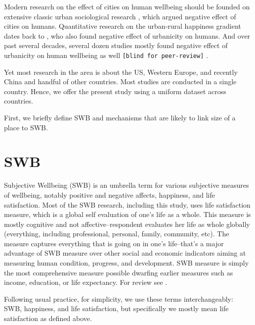 \documentclass[10pt, letterpaper]{article}
\begin{document}

Modern research on the effect of cities on human wellbeing should be founded on
extensive classic urban sociological research \citep{tonnies57,wirth38,simmel03,park15,park84}, 
which argued negative effect of cities on humans.
%
Quantitative research on the urban-rural happiness gradient dates back to
\citep{gurin60,campbell76etal}, who also found negative effect of
urbanicity on humans. And over past several decades, several dozen studies
mostly found negative effect of urbanicity on human wellbeing as well
\texttt{[blind for peer-review]}%
. 

Yet most research in the area is about the US, Western Europe, and recently China and handful of
other countries. Most studies are conducted in a single country. Hence, we offer
the present study using a uniform dataset across countries.

First, we briefly define SWB and mechanisms that are likely to link size of a
place to SWB. 
  
   
\section{SWB}

Subjective Wellbeing (SWB) is an umbrella term for various subjective measures
of wellbeing, notably positive and negative affects, happiness, and life
satisfaction. Most of the SWB research, including this study, uses life satisfaction measure, which is
a global self evaluation of one's life as a whole. This measure is mostly
cognitive and not affective--respondent evaluates her life as whole globally (everything,
including professional, personal, family, community, etc). The measure captures
everything that is going on in one's life--that's a major advantage of SWB
measure over other social and economic indicators aiming at measuring human
condition, progress, and development. SWB measure is simply the most
comprehensive measure possible dwarfing earlier measures such as income,
education, or life expectancy. For review see \citet{diener09}.

Following usual practice, for simplicity, we use these terms interchangeably: SWB, happiness, and
life satisfaction, but specifically we mostly mean life satisfaction as defined above.
\end{document}
